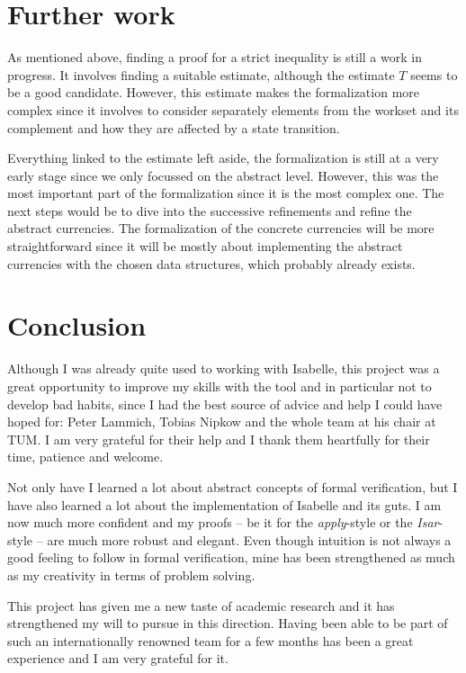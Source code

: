 \documentclass[12pt, a4 paper]{article}
\theoremstyle{definition}
\begin{document}
\section{Further work}
As mentioned above, finding a proof for a strict inequality is still a work in progress. It involves finding a suitable estimate, although the estimate $T$ seems to be a good candidate. However, this estimate makes the formalization more complex since it involves to consider separately elements from the workset and its complement and how they are affected by a state transition.

Everything linked to the estimate left aside, the formalization is still at a very early stage since we only focussed on the abstract level. However, this was the most important part of the formalization since it is the most complex one. The next steps would be to dive into the successive refinements and refine the abstract currencies. The formalization of the concrete currencies will be more straightforward since it will be mostly about implementing the abstract currencies with the chosen data structures, which probably already exists.

\section{Conclusion}

Although I was already quite used to working with Isabelle, this project was a great opportunity to improve my skills with the tool and in particular not to develop bad habits, since I had the best source of advice and help I could have hoped for: Peter Lammich, Tobias Nipkow and the whole team at his chair at TUM. I am very grateful for their help and I thank them heartfully for their time, patience and welcome.

Not only have I learned a lot about abstract concepts of formal verification, but I have also learned a lot about the implementation of Isabelle and its guts. I am now much more confident and my proofs -- be it for the \textit{apply}-style or the \textit{Isar}-style -- are much more robust and elegant. Even though intuition is not always a good feeling to follow in formal verification, mine has been strengthened as much as my creativity in terms of problem solving.

This project has given me a new taste of academic research and it has strengthened my will to pursue in this direction. Having been able to be part of such an internationally renowned team for a few months has been a great experience and I am very grateful for it.


% 

\pagebreak


\end{document}

